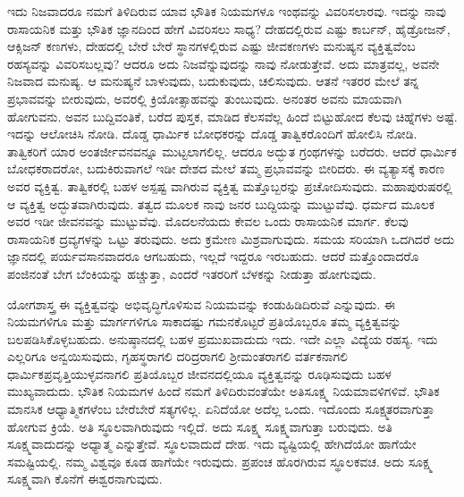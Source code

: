 ಇದು ನಿಜವಾದರೂ ನಮಗೆ ತಿಳಿದಿರುವ ಯಾವ ಭೌತಿಕ ನಿಯಮಗಳೂ ಇಂಥವನ್ನು ವಿವರಿಸಲಾರವು. ಇದನ್ನು ನಾವು ರಾಸಾಯನಿಕ ಮತ್ತು ಭೌತಿಕ ಜ್ಞಾನದಿಂದ ಹೇಗೆ ವಿವರಿಸಲು ಸಾಧ್ಯ? ದೇಹದಲ್ಲಿರುವ ಎಷ್ಟು ಕಾರ್ಬನ್, ಹೈಡ್ರೋಜನ್, ಆಕ್ಸಿಜನ್ ಕಣಗಳು, ದೇಹದಲ್ಲಿ ಬೇರೆ ಬೇರೆ ಸ್ಥಾನಗಳಲ್ಲಿರುವ ಎಷ್ಟು ಜೀವಕಣಗಳು ಮನುಷ್ಯನ ವ್ಯಕ್ತಿತ್ವವೆಂಬ ರಹಸ್ಯವನ್ನು ವಿವರಿಸಬಲ್ಲವು? ಆದರೂ ಅದು ನಿಜವೆನ್ನುವುದನ್ನು ನಾವು ನೋಡುತ್ತೇವೆ. ಅದು ಮಾತ್ರವಲ್ಲ, ಅವನೇ ನಿಜವಾದ ಮನುಷ್ಯ. ಆ ಮನುಷ್ಯನೆ ಬಾಳುವುದು, ಬದುಕುವುದು, ಚಲಿಸುವುದು. ಆತನೆ ಇತರರ ಮೇಲೆ ತನ್ನ ಪ್ರಭಾವವನ್ನು ಬೀರುವುದು, ಅವರಲ್ಲಿ ಕ್ರಿಯೋತ್ಸಾಹವನ್ನು ತುಂಬುವುದು. ಅನಂತರ ಅವನು ಮಾಯವಾಗಿ ಹೋಗುವನು. ಅವನ ಬುದ್ದಿವಂತಿಕೆ, ಬರೆದ ಪುಸ್ತಕ, ಮಾಡಿದ ಕೆಲಸವೆಲ್ಲ ಹಿಂದೆ ಬಿಟ್ಟುಹೋದ ಕೆಲವು ಚಿಹ್ನೆಗಳು ಅಷ್ಟೆ. ಇದನ್ನು ಆಲೋಚಿಸಿ ನೋಡಿ. ದೊಡ್ಡ ಧಾರ್ಮಿಕ ಬೋಧಕರನ್ನು ದೊಡ್ಡ ತಾತ್ವಿಕರೊಂದಿಗೆ ಹೋಲಿಸಿ ನೋಡಿ. ತಾತ್ವಿಕರಿಗೆ ಯಾರ ಅಂತರ್ಜೀವನವನ್ನೂ ಮುಟ್ಟಲಾಗಲಿಲ್ಲ. ಆದರೂ ಅದ್ಭುತ ಗ್ರಂಥಗಳನ್ನು ಬರೆದರು. ಆದರೆ ಧಾರ್ಮಿಕ ಬೋಧಕರಾದರೋ, ಬದುಕಿರುವಾಗಲೆ ಇಡೀ ದೇಶದ ಮೇಲೆ ತಮ್ಮ ಪ್ರಭಾವವನ್ನು ಬೀರಿದರು. ಈ ವ್ಯತ್ಯಾಸಕ್ಕೆ ಕಾರಣ ಅವರ ವ್ಯಕ್ತಿತ್ವ. ತಾತ್ವಿಕರಲ್ಲಿ ಬಹಳ ಅಸ್ಪಷ್ಟ ವಾಗಿರುವ ವ್ಯಕ್ತಿತ್ವ ಮತ್ತೊಬ್ಬರನ್ನು ಪ್ರಚೋದಿಸುವುದು. ಮಹಾಪುರುಷರಲ್ಲಿ ಆ ವ್ಯಕ್ತಿತ್ವ ಅದ್ಭುತವಾಗಿರುವುದು. ತತ್ವದ ಮೂಲಕ ನಾವು ಜನರ ಬುದ್ದಿಯನ್ನು ಮುಟ್ಟುವೆವು. ಧರ್ಮದ ಮೂಲಕ ಅವರ ಇಡೀ ಜೀವನವನ್ನು ಮುಟ್ಟುವೆವು. ಮೊದಲನೆಯದು ಕೇವಲ ಒಂದು ರಾಸಾಯನಿಕ ಮಾರ್ಗ. ಕೆಲವು ರಾಸಾಯನಿಕ ದ್ರವ್ಯಗಳನ್ನು ಒಟ್ಟು ತರುವುದು. ಅದು ಕ್ರಮೇಣ ಮಿಶ್ರವಾಗುವುದು. ಸಮಯ ಸರಿಯಾಗಿ ಒದಗಿದರೆ ಅದು ಜ್ಞಾನದಲ್ಲಿ ಪರ್ಯವಸಾನವಾದರೂ ಆಗಬಹುದು, ಇಲ್ಲದೆ ಇದ್ದರೂ ಇರಬಹುದು. ಆದರೆ ಮತ್ತೊಂದಾದರೊ ಪಂಜಿನಂತೆ ಬೇಗ ಬೆಂಕಿಯನ್ನು ಹಚ್ಚುತ್ತಾ, ಎಂದರೆ ಇತರರಿಗೆ ಬೆಳಕನ್ನು ನೀಡುತ್ತಾ ಹೋಗುವುದು.

ಯೋಗಶಾಸ್ತ್ರ ಈ ವ್ಯಕ್ತಿತ್ವವನ್ನು ಅಭಿವೃದ್ಧಿಗೊಳಿಸುವ ನಿಯಮವನ್ನು ಕಂಡುಹಿಡಿದಿರುವೆ ಎನ್ನುವುದು. ಈ ನಿಯಮಗಳಿಗೂ ಮತ್ತು ಮಾರ್ಗಗಳಿಗೂ ಸಾಕಾದಷ್ಟು ಗಮನಕೊಟ್ಟರೆ ಪ್ರತಿಯೊಬ್ಬರೂ ತಮ್ಮ ವ್ಯಕ್ತಿತ್ವವನ್ನು ಬಲಪಡಿಸಿಕೊಳ್ಳಬಹುದು. ಅನುಷ್ಠಾನದಲ್ಲಿ ಬಹಳ ಪ್ರಮುಖವಾದುದು ಇದು. ಇದೇ ಎಲ್ಲಾ ವಿದ್ಯೆಯ ರಹಸ್ಯ. ಇದು ಎಲ್ಲರಿಗೂ ಅನ್ವಯಿಸುವುದು, ಗೃಹಸ್ಥರಾಗಲಿ ದರಿದ್ರರಾಗಲಿ ಶ‍್ರೀಮಂತರಾಗಲಿ ವರ್ತಕನಾಗಲಿ ಧಾರ್ಮಿಕಪ್ರವೃತ್ತಿಯುಳ್ಳವನಾಗಲಿ ಪ್ರತಿಯೊಬ್ಬರ ಜೀವನದಲ್ಲಿಯೂ ವ್ಯಕ್ತಿತ್ವವನ್ನು ರೂಢಿಸುವುದು ಬಹಳ ಮುಖ್ಯವಾದುದು. ಭೌತಿಕ ನಿಯಮಗಳ ಹಿಂದೆ ನಮಗೆ ತಿಳಿದಿರುವಂತೆಯೇ ಅತಿಸೂಕ್ಷ್ಮ ನಿಯಮಾವಳಿಗಳಿವೆ. ಭೌತಿಕ ಮಾನಸಿಕ ಆಧ್ಯಾತ್ಮಿಕಗಳೆಂಬ ಬೇರೆಬೇರೆ ಸತ್ಯಗಳಿಲ್ಲ. ಏನಿದೆಯೋ ಅದೆಲ್ಲ ಒಂದು. ಇದೊಂದು ಸೂಕ್ಷ್ಮತರವಾಗುತ್ತಾ ಹೋಗುವ ಕ್ರಿಯೆ. ಅತಿ ಸ್ಥೂಲವಾಗಿರುವುದು ಇಲ್ಲಿದೆ. ಅದು ಸೂಕ್ಷ್ಮ ಸೂಕ್ಷ್ಮವಾಗುತ್ತಾ ಬರುವುದು. ಅತಿ ಸೂಕ್ಷ್ಮವಾದುದನ್ನು ಅಧ್ಯಾತ್ಮ ಎನ್ನುತ್ತೇವೆ. ಸ್ಥೂಲವಾದುದೆ ದೇಹ. ಇದು ವ್ಯಷ್ಟಿಯಲ್ಲಿ ಹೇಗಿದೆಯೋ ಹಾಗೆಯೇ ಸಮಷ್ಟಿಯಲ್ಲಿ. ನಮ್ಮ ವಿಶ್ವವೂ ಕೂಡ ಹಾಗೆಯೇ ಇರುವುದು. ಪ್ರಪಂಚ ಹೊರಗಿರುವ ಸ್ಥೂಲಕವಚ. ಅದು ಸೂಕ್ಷ್ಮ ಸೂಕ್ಷ್ಮವಾಗಿ ಕೊನೆಗೆ ಈಶ್ವರನಾಗುವುದು.

